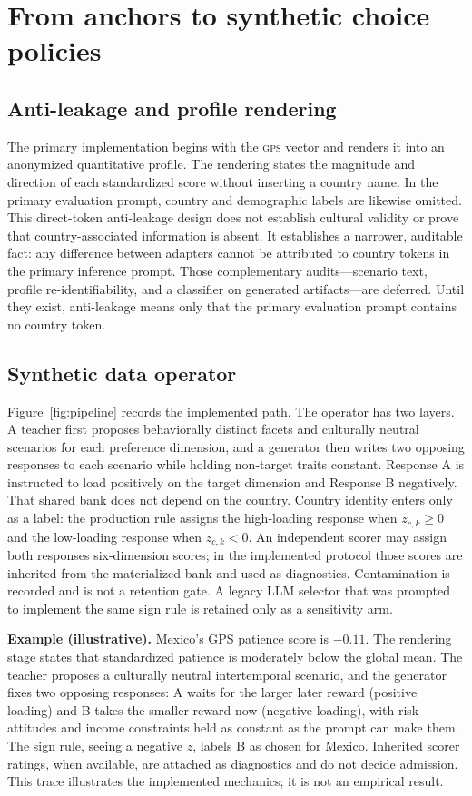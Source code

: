 \documentclass[10pt,letterpaper]{article}
\newcommand{\GPS}{\textsc{gps}}
\begin{document}
\section{From anchors to synthetic choice policies}
\subsection{Anti-leakage and profile rendering}
The primary implementation begins with the \GPS{} vector and renders it into an anonymized quantitative profile. The rendering states the magnitude and direction of each standardized score without inserting a country name. In the primary evaluation prompt, country and demographic labels are likewise omitted. This direct-token anti-leakage design does not establish cultural validity or prove that country-associated information is absent. It establishes a narrower, auditable fact: any difference between adapters cannot be attributed to country tokens in the primary inference prompt. Those complementary audits---scenario text, profile re-identifiability, and a classifier on generated artifacts---are deferred. Until they exist, anti-leakage means only that the primary evaluation prompt contains no country token.

\subsection{Synthetic data operator}
Figure~\ref{fig:pipeline} records the implemented path. The operator has two layers. A teacher first proposes behaviorally distinct facets and culturally neutral scenarios for each preference dimension, and a generator then writes two opposing responses to each scenario while holding non-target traits constant. Response A is instructed to load positively on the target dimension and Response B negatively. That shared bank does not depend on the country. Country identity enters only as a label: the production rule assigns the high-loading response when $z_{c,k}\ge 0$ and the low-loading response when $z_{c,k}<0$. An independent scorer may assign both responses six-dimension scores; in the implemented protocol those scores are inherited from the materialized bank and used as diagnostics. Contamination is recorded and is not a retention gate. A legacy LLM selector that was prompted to implement the same sign rule is retained only as a sensitivity arm.

\noindent\textbf{Example (illustrative).} Mexico's GPS patience score is $-0.11$. The rendering stage states that standardized patience is moderately below the global mean. The teacher proposes a culturally neutral intertemporal scenario, and the generator fixes two opposing responses: A waits for the larger later reward (positive loading) and B takes the smaller reward now (negative loading), with risk attitudes and income constraints held as constant as the prompt can make them. The sign rule, seeing a negative $z$, labels B as chosen for Mexico. Inherited scorer ratings, when available, are attached as diagnostics and do not decide admission. This trace illustrates the implemented mechanics; it is not an empirical result.
\end{document}

